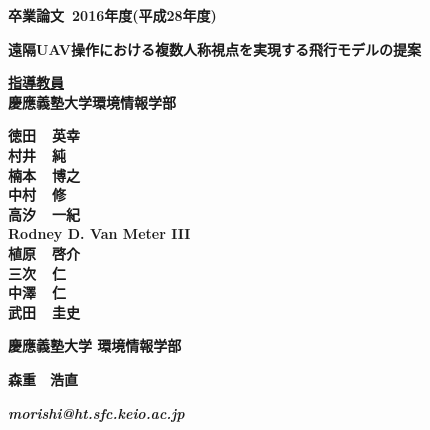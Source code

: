 \pagestyle{empty}

\begin{center}

\vspace{5cm}

\textbf{\Large 卒業論文~2016年度(平成28年度)}

\vspace{2cm}

\textbf{\LARGE 遠隔UAV操作における複数人称視点を実現する飛行モデルの提案}

\vspace{3cm}

\textbf{\underline{\large 指導教員}}\\
\textbf{慶應義塾大学環境情報学部}

\textbf{\Large 徳田~~英幸}\\
\textbf{\Large 村井~~純}\\
\textbf{\Large 楠本~~博之}\\
\textbf{\Large 中村~~修}\\
\textbf{\Large 高汐~~一紀}\\
\textbf{\Large Rodney D. Van Meter III}\\
\textbf{\Large 植原~~啓介}\\
\textbf{\Large 三次~~仁}\\
\textbf{\Large 中澤~~仁}\\
\textbf{\Large 武田~~圭史}\\

\vspace{6cm}

\textbf{\LARGE 慶應義塾大学 環境情報学部}

\vspace{.5em}

\textbf{\LARGE 森重　浩直}

\vspace{.3em}

\textbf{\it morishi@ht.sfc.keio.ac.jp}



\newpage

\end{center}

\pagestyle{plain}
